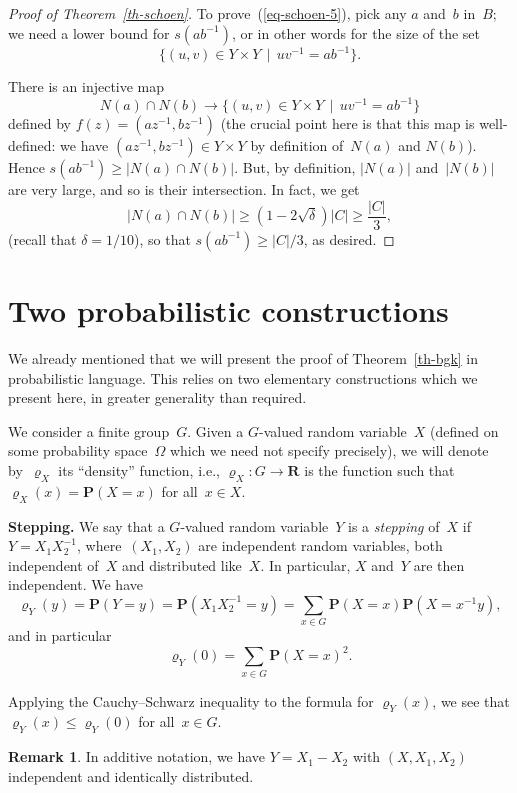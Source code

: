 \documentclass[12pt]{amsart}
\renewcommand{\leq}{\leqslant}
\renewcommand{\geq}{\geqslant}
\numberwithin{equation}{section}
\newcommand{\Rr}{\mathbf{R}}
\newcommand{\proba}{\mathbf{P}}
\renewcommand{\rho}{\varrho}
\theoremstyle{plain}
\theoremstyle{remark}
\theoremstyle{definition}
\newtheorem{remark}[theorem]{Remark}
\renewcommand{\geq}{\geqslant}
\renewcommand{\leq}{\leqslant}
\begin{document}
\begin{proof}[Proof of Theorem~\ref{th-schoen}]
  To prove~(\ref{eq-schoen-5}), pick any $a$ and~$b$ in~$B$; we need a
  lower bound for $s(ab^{-1})$, or in other words for the size of the
  set
  $$
  \{(u,v)\in Y\times Y\,\mid\, uv^{-1}=ab^{-1}\}.
  $$

  There is an injective map
  $$
  N(a)\cap N(b)\to \{(u,v)\in Y\times Y\,\mid\, uv^{-1}=ab^{-1}\}
  $$
  defined by $f(z)=(az^{-1},bz^{-1})$ (the crucial point here is that
  this map is well-defined: we have $(az^{-1},bz^{-1})\in Y\times Y$ by
  definition of~$N(a)$ and $N(b)$). Hence
  $s(ab^{-1})\geq |N(a)\cap N(b)|$. But, by definition, $|N(a)|$
  and~$|N(b)|$ are very large, and so is their intersection. In fact, we
  get
  $$
  |N(a)\cap N(b)|\geq (1-2\sqrt{\delta})|C|\geq \frac{|C|}{3},
  $$
  (recall that $\delta=1/10$), so that $s(ab^{-1})\geq |C|/3$, as
  desired.
\end{proof}

\section{Two probabilistic constructions}
\label{sec-constructs}

We already mentioned that we will present the proof of
Theorem~\ref{th-bgk} in probabilistic language. This relies on two
elementary constructions which we present here, in greater generality
than required.

We consider a finite group~$G$. Given a $G$-valued random variable~$X$
(defined on some probability space~$\Omega$ which we need not specify
precisely), we will denote by~$\rho_X$ its ``density'' function, i.e.,
$\rho_X\colon G\to\Rr$ is the function such that $\rho_X(x)=\proba(X=x)$
for all~$x\in X$.

\textbf{Stepping.} We say that a $G$-valued random variable~$Y$ is a
\emph{stepping} of~$X$ if~$Y=X_1X_2^{-1}$, where~$(X_1,X_2)$ are
independent random variables, both independent of~$X$ and distributed
like~$X$. In particular, $X$ and~$Y$ are then independent. We have
$$
\rho_Y(y)=\proba(Y=y)=\proba(X_1X_2^{-1}=y)=\sum_{x\in
  G}\proba(X=x)\proba(X=x^{-1}y),
$$
and in particular
\begin{equation}\label{eq-rho0}
  \rho_Y(0)=\sum_{x\in G}\proba(X=x)^2.
\end{equation}

Applying the Cauchy--Schwarz inequality to the formula for $\rho_Y(x)$,
we see that $\rho_Y(x)\leq \rho_Y(0)$ for all~$x\in G$.

\begin{remark}
  In additive notation, we have $Y=X_1-X_2$ with $(X,X_1,X_2)$
  independent and identically distributed.
\end{remark}
\end{document}
